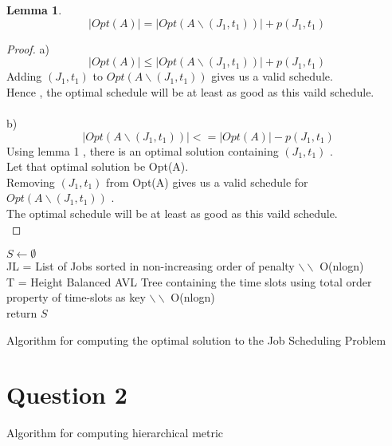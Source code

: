 \documentclass[11pt]{article}
\newtheorem{lemma}[theorem]{Lemma}
\begin{document}
\begin{lemma}
\[ 
 \vert Opt(A) \vert = \vert Opt(A\backslash(J_1,t_1)) \vert + p(J_1,t_1) 
\]
\end{lemma}
\begin{proof}
a) 
\[ 
 \vert Opt(A) \vert \leq \vert Opt(A\backslash(J_1,t_1)) \vert + p(J_1,t_1) 
\]
Adding $(J_1,t_1)$ to $Opt(A\backslash(J_1,t_1))$ gives us a valid schedule.\\
Hence , the optimal schedule will be at least as good as this vaild schedule. \\\\
b) \\
\[ 
\ \vert Opt(A\backslash(J_1,t_1)) \vert <= \vert Opt(A) \vert - p(J_1,t_1) 
\]
Using lemma 1 , there is an optimal solution containing $(J_1,t_1)$ .\\
Let that optimal solution be Opt(A). \\
Removing $(J_1,t_1)$ from Opt(A) gives us a valid schedule for $Opt(A\backslash(J_1,t_1))$ . \\
The optimal schedule will be at least as good as this vaild schedule. \\
\end{proof}
\begin{algorithm}[h]
$S\leftarrow \emptyset$\\
JL = List of Jobs sorted in non-increasing order of penalty $\backslash \backslash$ O(nlogn) \\
T = Height Balanced AVL Tree containing the time slots  using total order property of time-slots as key $\backslash \backslash$ O(nlogn) \\
return $S$
\caption{Algorithm for computing the optimal solution to the Job Scheduling Problem}
\label{skeleton}
\end{algorithm}
\pagebreak
\section*{Question 2}
\begin{algorithm}[h]

\caption{Algorithm for computing hierarchical metric}
\label{skeleton}
\end{algorithm}
\end{document}
